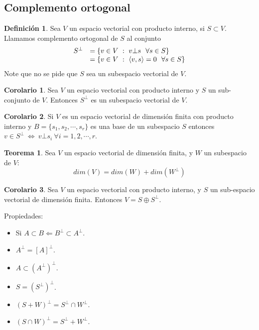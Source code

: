 \documentclass[10pt]{article}
\theoremstyle{definition}
\newtheorem{definition}{Definición}[section]
\newtheorem{theorem}{Teorema}[section]
\newtheorem{corollary}{Corolario}[theorem]
\begin{document}
\subsection{Complemento ortogonal}
\begin{definition}
	Sea $V$ un espacio vectorial con producto interno, si $S\subset V$. Llamamos complemento ortogonal de $S$ al conjunto $$\begin{array}{ c l }
			S^{\bot } & =\{v\in V\ :\ v\bot s\ \ \forall s\in S\}               \\
			          & =\{v\in V\ :\ \langle v,s\rangle =0\ \ \forall s\in S\}
		\end{array}$$
	Note que no se pide que $S$ sea un subespacio vectorial de $V$.
\end{definition}
\begin{corollary}
	Sea $V$ un espacio vectorial con producto interno y $S$ un sub-conjunto de $V$. Entonces $S^\bot$ es un subespacio vectorial de $V$.
\end{corollary}
\begin{corollary}
	Si $V$ es un espacio vectorial de dimensión finita con producto interno y $B=\{s_1,s_2,\cdots,s_r\}$ es una base de un subespacio $S$ entonces $v\in S^\bot\ \Leftrightarrow\ v\bot s_i\ \forall i=1,2,\cdots,r$.
\end{corollary}
\begin{theorem}
	Sea $V$ un espacio vectorial de dimensión finita, y $W$ un subespacio de $V$:$$dim(V)=dim(W)+dim(W^\bot)$$
\end{theorem}
\begin{corollary}
	Sea $V$ un espacio vectorial con producto interno, y $S$ un sub-espacio vectorial de dimensión finita. Entonces $V=S\oplus S^\bot$.
\end{corollary}
Propiedades:
\begin{itemize}
	\item Si $A\subset B \Leftarrow B^\bot \subset A^\bot$.
	\item $A^\bot = [A]^\bot$.
	\item $A\subset (A^\bot)^\bot$.
	\item $S=(S^\bot)^\bot$.
	\item $(S+W)^\bot =S^\bot \cap W^\bot$.
	\item $(S\cap W)^\bot = S^\bot + W^\bot$.
\end{itemize}
\end{document}
